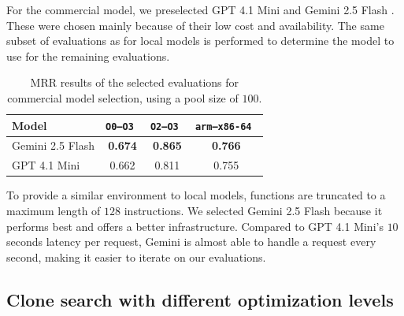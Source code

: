 For the commercial model, we preselected GPT 4.1 Mini \cite{gpt4} and Gemini 2.5 Flash \cite{gemini2.5}.
These were chosen mainly because of their low cost and availability. The same subset of evaluations as for local models is performed to determine
the model to use for the remaining evaluations.
{
    \renewcommand{\arraystretch}{1.1}
    \begin{table}
    \centering
    \begin{tabular}{|l|ccc|} \hline
    Model            & \tt O0--O3 & \tt O2--O3 & \tt arm--x86-64 \\ \hline
    Gemini 2.5 Flash & \bf 0.674  & \bf 0.865  & \bf 0.766        \\
    GPT 4.1 Mini     & 0.662      & 0.811      & 0.755            \\ \hline
    \end{tabular}
    \caption{MRR results of the selected evaluations for commercial model selection, using a pool size of \(100\).}
    \end{table}
}

To provide a similar environment to local models, functions are truncated to a maximum length of \(128\) instructions.
We selected Gemini 2.5 Flash because it performs best and offers a better infrastructure. Compared to GPT 4.1 Mini's \(10\) seconds
latency per request, Gemini is almost able to handle a request every second, making it easier to iterate on our evaluations.

\subsection{Clone search with different optimization levels}

